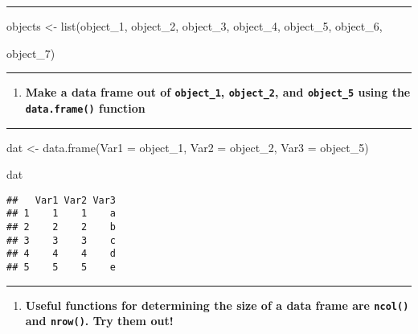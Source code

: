 \documentclass[
]{article}
\newenvironment{Shaded}{\begin{snugshade}}{\end{snugshade}}
\newcommand{\AttributeTok}[1]{\textcolor[rgb]{0.77,0.63,0.00}{#1}}
\newcommand{\FunctionTok}[1]{\textcolor[rgb]{0.00,0.00,0.00}{#1}}
\newcommand{\NormalTok}[1]{#1}
\newcommand{\OtherTok}[1]{\textcolor[rgb]{0.56,0.35,0.01}{#1}}
\providecommand{\tightlist}{%
  \setlength{\itemsep}{0pt}\setlength{\parskip}{0pt}}
\begin{document}
\begin{center}\rule{0.5\linewidth}{0.5pt}\end{center}

\begin{Shaded}
\begin{Highlighting}[]
\NormalTok{objects }\OtherTok{\textless{}{-}} \FunctionTok{list}\NormalTok{(object\_1, object\_2, object\_3, object\_4, object\_5, object\_6,}

\NormalTok{                object\_7)}
\end{Highlighting}
\end{Shaded}

\begin{center}\rule{0.5\linewidth}{0.5pt}\end{center}

\begin{enumerate}
\def\labelenumi{\arabic{enumi}.}
\setcounter{enumi}{3}
\tightlist
\item
  \textbf{Make a data frame out of \texttt{object\_1},
  \texttt{object\_2}, and \texttt{object\_5} using the
  \texttt{data.frame()} function}
\end{enumerate}

\begin{center}\rule{0.5\linewidth}{0.5pt}\end{center}

\begin{Shaded}
\begin{Highlighting}[]
\NormalTok{dat }\OtherTok{\textless{}{-}} \FunctionTok{data.frame}\NormalTok{(}\AttributeTok{Var1 =}\NormalTok{ object\_1, }\AttributeTok{Var2 =}\NormalTok{ object\_2, }\AttributeTok{Var3 =}\NormalTok{ object\_5)}

\NormalTok{dat}
\end{Highlighting}
\end{Shaded}

\begin{verbatim}
##   Var1 Var2 Var3
## 1    1    1    a
## 2    2    2    b
## 3    3    3    c
## 4    4    4    d
## 5    5    5    e
\end{verbatim}

\begin{center}\rule{0.5\linewidth}{0.5pt}\end{center}

\begin{enumerate}
\def\labelenumi{\arabic{enumi}.}
\setcounter{enumi}{4}
\tightlist
\item
  \textbf{Useful functions for determining the size of a data frame are
  \texttt{ncol()} and \texttt{nrow()}. Try them out!}
\end{enumerate}
\end{document}
